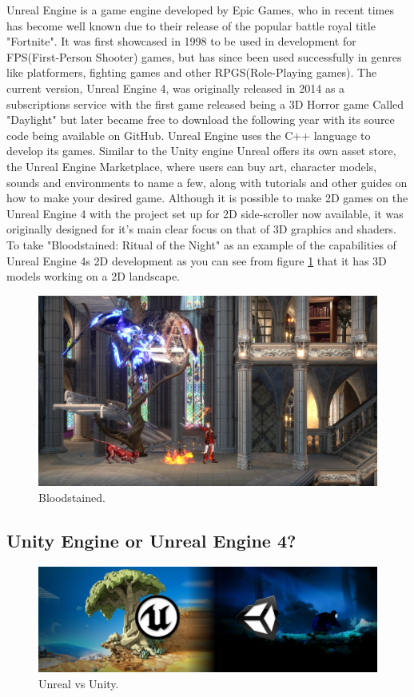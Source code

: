 Unreal Engine is a game engine developed by Epic Games, who in recent times has become well known due to their release of the popular battle royal title "Fortnite". It was first showcased in 1998 to be used in development for FPS(First-Person Shooter) games, but has since been used successfully in genres like platformers, fighting games and other RPGS(Role-Playing games). The current version, Unreal Engine 4, was originally released in 2014 as a subscriptions service with the first game released being a 3D Horror game Called "Daylight" but later became free to download the following year with its source code being available on GitHub. Unreal Engine uses the C++ language to develop its games. Similar to the Unity engine Unreal offers its own asset store, the Unreal Engine Marketplace, where users can buy art, character models, sounds and environments to name a few, along with tutorials and other guides on how to make your desired game.
Although it is possible to make 2D games on the Unreal Engine 4 with the project set up for 2D side-scroller now available, it was originally designed for it's main clear focus  on that of 3D graphics and shaders. To take "Bloodstained: Ritual of the Night" as an example of the capabilities of Unreal Engine 4s 2D development as you can see from figure \ref{fig:Bloodstained} that it has 3D models working on a 2D landscape.\cite{UnrealEngine4}

\begin{figure}[h]
  \includegraphics[width=\linewidth]{Images/Bloodstained-1080.jpg}
  \caption{Bloodstained.}
  \label{fig:Bloodstained}
\end{figure}

\newpage
\subsection{Unity Engine or Unreal Engine 4?}
\begin{figure}[h]
  \includegraphics[width=\linewidth]{Images/UnrealVSUnity.jpg}
  \caption{Unreal vs Unity.}
  \label{fig:Unreal vs Unity}
\end{figure}
\bigskip

